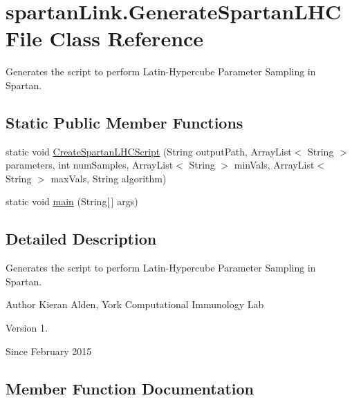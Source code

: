 \hypertarget{classspartanLink_1_1GenerateSpartanLHCFile}{}\section{spartan\+Link.\+Generate\+Spartan\+L\+H\+C\+File Class Reference}
\label{classspartanLink_1_1GenerateSpartanLHCFile}


Generates the script to perform Latin-\/\+Hypercube Parameter Sampling in Spartan.  


\subsection*{Static Public Member Functions}
\begin{DoxyCompactItemize}
\item 
static void \hyperlink{classspartanLink_1_1GenerateSpartanLHCFile_a3d1d8765cb9332f9701b2dad2972ed3e}{Create\+Spartan\+L\+H\+C\+Script} (String output\+Path, Array\+List$<$ String $>$ parameters, int num\+Samples, Array\+List$<$ String $>$ min\+Vals, Array\+List$<$ String $>$ max\+Vals, String algorithm)
\item 
static void \hyperlink{classspartanLink_1_1GenerateSpartanLHCFile_a2395fe41bd10ffffb98dd861d54b6873}{main} (String\mbox{[}$\,$\mbox{]} args)
\end{DoxyCompactItemize}


\subsection{Detailed Description}
Generates the script to perform Latin-\/\+Hypercube Parameter Sampling in Spartan. 

\begin{DoxyAuthor}{Author}
Kieran Alden, York Computational Immunology Lab 
\end{DoxyAuthor}
\begin{DoxyVersion}{Version}
1. 
\end{DoxyVersion}
\begin{DoxySince}{Since}
February 2015 
\end{DoxySince}


\subsection{Member Function Documentation}
\hypertarget{classspartanLink_1_1GenerateSpartanLHCFile_a3d1d8765cb9332f9701b2dad2972ed3e}{}
